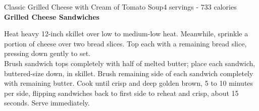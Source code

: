 \begin{recipe}{Classic Grilled Cheese with Cream of Tomato Soup}{4 servings - 733 calories}
\textbf{Grilled Cheese Sandwiches}

Heat heavy 12-inch skillet over low to medium-low heat. Meanwhile, sprinkle a portion of cheese over two bread slices. Top each with a remaining bread slice, pressing down gently to set.\\

Brush sandwich tops completely with half of melted butter; place each sandwich, buttered-size down, in skillet. Brush remaining side of each sandwich completely with remaining butter. Cook until crisp and deep golden brown, 5 to 10 minutes per side, flipping sandwiches back to first side to reheat and crisp, about 15 seconds. Serve immediately.

\end{recipe}